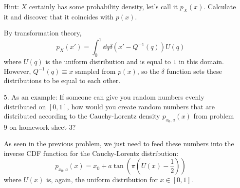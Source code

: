 \documentclass[a4paper,twoside]{article}
\begin{document}
\begin{itemize}
        Hint: $ X $ certainly has some probability density, let's call it $ p_{X}(x) $. Calculate it and discover that it coincides with $ p(x) $.
        \begin{problem}
            By transformation theory,
            \begin{equation}
                p_X(x') = \int_0^1 \dd{q} \delta(x' - Q^{-1}(q)) U(q)
            \end{equation}
            where $ U(q) $ is the uniform distribution and is equal to $ 1 $ in this domain. However, $ Q^{-1}(q) \equiv x $ sampled from $ p(x) $, so the $\delta$ function sets these distributions to be equal to each other.
        \end{problem}
    \item[5.] As an example: If someone can give you random numbers evenly distributed on $ [0,1] $, how would you create random numbers that are distributed according to the Cauchy-Lorentz density $ p_{x_0, a}(x) $ from problem 9 on homework sheet 3?
        \begin{problem}
            As seen in the previous problem, we just need to feed these numbers into the inverse CDF function for the Cauchy-Lorentz distribution:
            \begin{equation}
                p_{x_0, a}(x) = x_0 + a \tan(\pi \left(U(x) - \frac{1}{2}\right))
            \end{equation}
            where $ U(x) $ is, again, the uniform distribution for $ x \in [0,1] $.
        \end{problem}
\end{itemize}
\end{document}
